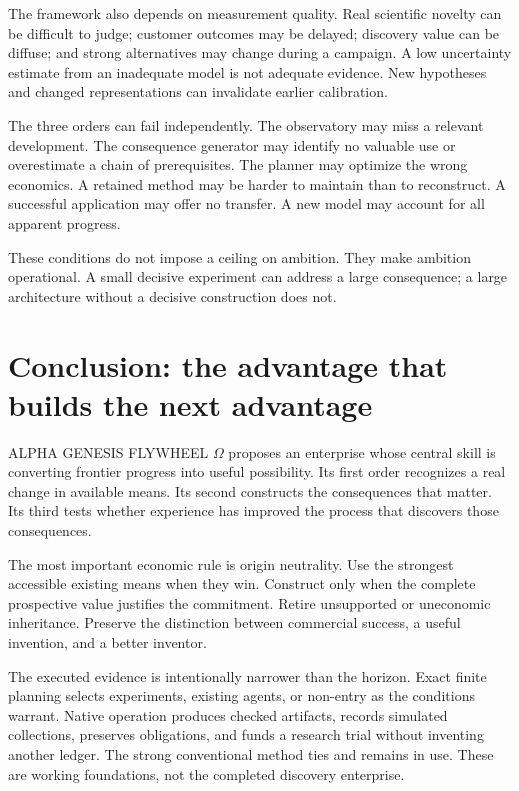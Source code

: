 \documentclass[11pt,letterpaper]{article}
\theoremstyle{remark}\newtheorem{remark}{Remark}[section]
\begin{document}
The framework also depends on measurement quality. Real scientific novelty can be difficult to judge; customer outcomes may be delayed; discovery value can be diffuse; and strong alternatives may change during a campaign. A low uncertainty estimate from an inadequate model is not adequate evidence. New hypotheses and changed representations can invalidate earlier calibration.

The three orders can fail independently. The observatory may miss a relevant development. The consequence generator may identify no valuable use or overestimate a chain of prerequisites. The planner may optimize the wrong economics. A retained method may be harder to maintain than to reconstruct. A successful application may offer no transfer. A new model may account for all apparent progress.



These conditions do not impose a ceiling on ambition. They make ambition operational. A small decisive experiment can address a large consequence; a large architecture without a decisive construction does not.

\section{Conclusion: the advantage that builds the next advantage}
ALPHA GENESIS FLYWHEEL $\Omega$ proposes an enterprise whose central skill is converting frontier progress into useful possibility. Its first order recognizes a real change in available means. Its second constructs the consequences that matter. Its third tests whether experience has improved the process that discovers those consequences.

The most important economic rule is origin neutrality. Use the strongest accessible existing means when they win. Construct only when the complete prospective value justifies the commitment. Retire unsupported or uneconomic inheritance. Preserve the distinction between commercial success, a useful invention, and a better inventor.

The executed evidence is intentionally narrower than the horizon. Exact finite planning selects experiments, existing agents, or non-entry as the conditions warrant. Native operation produces checked artifacts, records simulated collections, preserves obligations, and funds a research trial without inventing another ledger. The strong conventional method ties and remains in use. These are working foundations, not the completed discovery enterprise.
\end{document}
